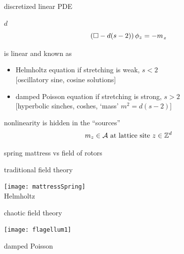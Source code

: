 \begin{frame}{discretized linear PDE}
\begin{block}{$d$\dmn\ \catlatt}
{\Large
\[
 (\Box -d(s-2))\,\phi_{z} = - {m_{}}_z
\] %
}
\end{block}

\bigskip

is linear and known as
\begin{itemize}
\item {\color{blue}Helmholtz} equation if stretching is weak, $s<2$ \\
 $[$oscillatory sine, cosine solutions]
\item {\color{blue}damped Poisson} equation if stretching is strong, $s>2$ \\
 $[$hyperbolic sinches, coshes, `{\color{blue}mass}' $m^2=d(s-2)$]
\end{itemize}
nonlinearity is hidden in the ``sources''
\[
  {m_{z}} \in \mathcal{A}
    \mbox{  at lattice site  }
  z\in \mathbb{Z}^{d}
\]
\end{frame}

\begin{frame}{spring mattress vs field of rotors}
\begin{center}
            \begin{minipage}[c]{0.40\textwidth}\begin{center}
traditional field theory
\bigskip

\texttt{[image: mattressSpring]}\\
{\color{blue}Helmholtz}
            \end{center}\end{minipage}
            \hspace{2ex}
            \begin{minipage}[c]{0.46\textwidth}\begin{center}
chaotic field theory\\
\bigskip
\bigskip
\bigskip

\texttt{[image: flagellum1]}\\
\bigskip

damped {\color{blue}Poisson}
            \end{center}\end{minipage}
\end{center}
\end{frame}

